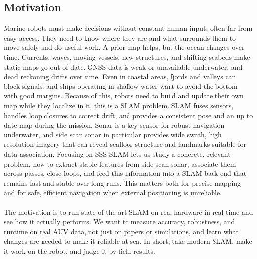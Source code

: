\subsection{Motivation}
Marine robots must make decisions without constant human input, often far from easy access. They need to know where they are and what surrounds them to move safely and do useful work. A prior map helps, but the ocean changes over time. Currents, waves, moving vessels, new structures, and shifting seabeds make static maps go out of date. GNSS data is weak or unavailable underwater, and dead reckoning drifts over time. Even in coastal areas, fjords and valleys can block signals, and ships operating in shallow water want to avoid the bottom with good margins. Because of this, robots need to build and update their own map while they localize in it, this is a SLAM problem. SLAM fuses sensors, handles loop closures to correct drift, and provides a consistent pose and an up to date map during the mission. Sonar is a key sensor for robust navigation underwater, and side scan sonar in particular provides wide swath, high resolution imagery that can reveal seafloor structure and landmarks suitable for data association. Focusing on SSS SLAM lets us study a concrete, relevant problem, how to extract stable features from side scan sonar, associate them across passes, close loops, and feed this information into a SLAM back-end that remains fast and stable over long runs. This matters both for precise mapping and for safe, efficient navigation when external positioning is unreliable.
\\ \\
The motivation is to run state of the art SLAM on real hardware in real time and see how it actually performs. We want to measure accuracy, robustness, and runtime on real AUV data, not just on papers or simulations, and learn what changes are needed to make it reliable at sea. In short, take modern SLAM, make it work on the robot, and judge it by field results.